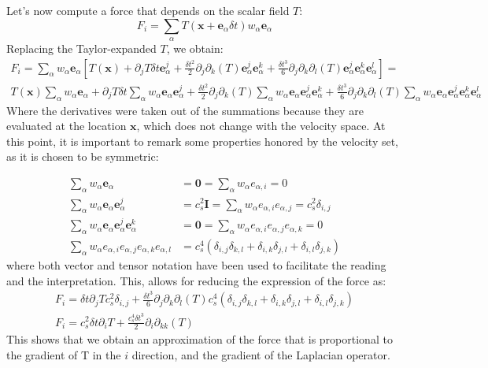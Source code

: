 \documentclass{article}
\newcommand{\locx}{\mathbf{x}}
\newcommand{\vele}{\mathbf{e}_\alpha}
\begin{document}
	
	Let's now compute a force that depends on the scalar field $T$:
	\begin{equation*}
	F_i = \sum_\alpha T (\locx + \vele \delta t)  w_\alpha \vele
	\end{equation*}
	Replacing the Taylor-expanded $T$, we obtain:
	\begin{equation*}
	\begin{split}
	F_i = \sum_\alpha w_\alpha \vele [ T(\mathbf{x}) + \partial_j T \delta t \vele^j + \frac{\delta t^2}{2} \partial_j \partial_k (T) \vele^j \vele^k + \frac{\delta t^3}{6} \partial_j \partial_k \partial_l (T)  \vele^j \vele^k \vele^l ] = \\
	T(\mathbf{x}) \sum_\alpha w_\alpha \vele + \partial_j T \delta t \sum_\alpha w_\alpha \vele\vele^j + \frac{\delta t^2}{2} \partial_j \partial_k (T) \sum_\alpha w_\alpha \vele \vele^j \vele^k + \frac{\delta t^3}{6} \partial_j \partial_k \partial_l (T) \sum_\alpha w_\alpha \vele \vele^j \vele^k \vele^l 
	\end{split}
	\end{equation*}
	Where the derivatives were taken out of the summations because they are evaluated at the location $\locx$, which does not change with the velocity space. At this point, it is important to remark some properties honored by the velocity set, as it is chosen to be symmetric:
	
	\begin{equation*}
		\begin{split}
		\sum_\alpha w_\alpha \vele & = \mathbf{0} = \sum_\alpha w_\alpha e_{\alpha,i} = 0\\ 
		\sum_\alpha w_\alpha \vele \vele^j & = c_s^2\mathbf{I} = \sum_\alpha w_\alpha e_{\alpha,i} e_{\alpha,j} = c_s^2 \delta_{i,j}\\
		\sum_\alpha w_\alpha \mathbf{e}_\alpha \mathbf{e}_\alpha^j \mathbf{e}_\alpha^k & = \mathbf{0} = \sum_\alpha w_\alpha e_{\alpha,i} e_{\alpha,j} e_{\alpha,k} = 0\\
		\sum_\alpha w_\alpha e_{\alpha,i} e_{\alpha,j} e_{\alpha,k} e_{\alpha,l} & = c_s^4 (\delta_{i,j} \delta_{k,l} + \delta_{i,k} \delta_{j,l} + \delta_{i,l} \delta_{j,k})
		\end{split}
	\end{equation*}
	where both vector and tensor notation have been used to facilitate the reading and the interpretation. This, allows for reducing the expression of the force as:
	\begin{equation}\label{eq:taylorExpansion}
	\begin{split}
	F_i = \delta t  \partial_j T c_s^2 \delta_{i,j} + \frac{\delta t^3}{6} \partial_j \partial_k \partial_l (T) c_s^4 (\delta_{i,j} \delta_{k,l} + \delta_{i,k} \delta_{j,l} + \delta_{i,l} \delta_{j,k})\\
	F_i = c_s^2 \delta t  \partial_i T  + \frac{c_s^4\delta t^3}{2} \partial_i \partial_{kk} (T) 
	\end{split}
	\end{equation}
	This shows that we obtain an approximation of the force that is proportional to the gradient of T in the $i$ direction, and the gradient of the Laplacian operator. 
	
\end{document}
